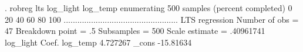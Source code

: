 . robreg lts log_light log_temp
{\smallskip}
enumerating 500 samples (percent completed)
0  20  40  60  80  100
..................................................
{\smallskip}
LTS regression                                  Number of obs     =         47
                                                  Breakdown point =         .5
                                                  Subsamples      =        500
                                                  Scale estimate  =  .40961741
{\smallskip}
   log_light {\VBAR}      Coef.
    log_temp {\VBAR}   4.727267
       _cons {\VBAR}  -15.81634
{\smallskip}
